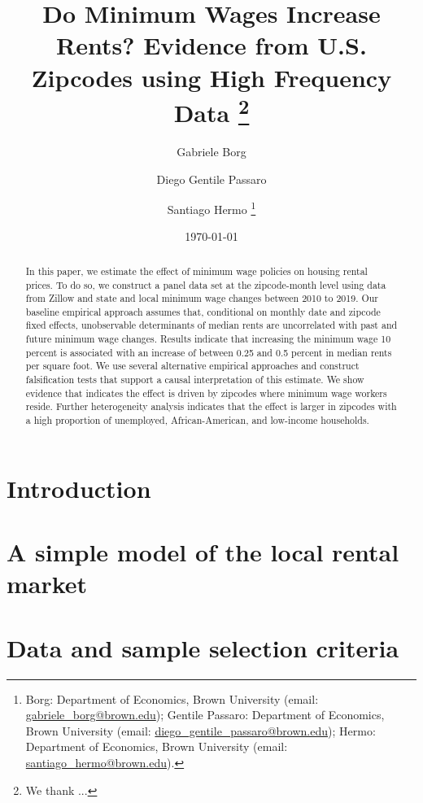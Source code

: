 \documentclass{article}
\title{Do Minimum Wages Increase Rents? 
	   Evidence from U.S. Zipcodes using High Frequency Data \thanks{We thank ...}}
\author{Gabriele Borg \and Diego Gentile Passaro \and Santiago Hermo
		\footnote{Borg: Department of Economics, Brown University (email: 
		\url{gabriele_borg@brown.edu}); 
		Gentile Passaro: Department of Economics, Brown University (email: 
		\url{diego_gentile_passaro@brown.edu}); 
		Hermo: Department of Economics, Brown University (email: 
		\url{santiago_hermo@brown.edu}).}
		}
\date{\today}
\begin{document}
\maketitle

\begin{abstract}
    \noindent 
    In this paper, we estimate the effect of minimum wage policies on housing rental prices. 
    To do so, we construct a panel data set at the zipcode-month level using data from Zillow 
    and state and local minimum wage changes between 2010 to 2019. Our baseline empirical 
    approach assumes that, conditional on monthly date and zipcode fixed effects, 
    unobservable determinants of median rents are uncorrelated with past and future minimum 
    wage changes. Results indicate that increasing the minimum wage 10 percent is associated 
    with an increase of between 0.25 and 0.5 percent in median rents per square foot. We use 
    several alternative empirical approaches and construct falsification tests that support a 
    causal interpretation of this estimate. We show evidence that indicates the effect is 
    driven by zipcodes where minimum wage workers reside. Further heterogeneity analysis 
    indicates that the effect is larger in zipcodes with a high proportion of unemployed, 
    African-American, and low-income households.
\end{abstract}

\vspace{5mm}

\maketitle
\onehalfspacing

\clearpage

\section{Introduction}\label{sec:intro}
    

\section{A simple model of the local rental market}\label{sec:model}
    

\section{Data and sample selection criteria}\label{sec:data}
	
\end{document}
